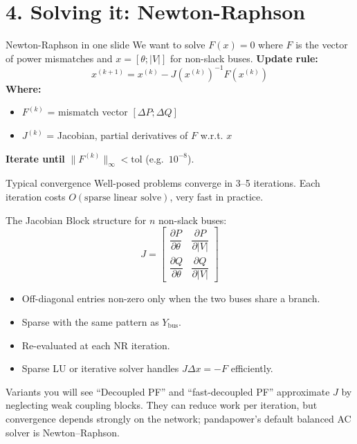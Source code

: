 \documentclass[aspectratio=169,10pt]{beamer}
\begin{document}
\section*{4. Solving it: Newton-Raphson}

\begin{frame}{Newton-Raphson in one slide}
We want to solve $F(x) = 0$ where $F$ is the vector of power mismatches and $x = [\theta; |V|]$ for non-slack buses.
\vspace{0.4em}
\textbf{Update rule:}
\begin{equation*}
x^{(k+1)} = x^{(k)} - J(x^{(k)})^{-1} F(x^{(k)})
\end{equation*}
\textbf{Where:}
\begin{itemize}
  \item $F^{(k)}$ = mismatch vector $[\Delta P; \Delta Q]$
  \item $J^{(k)}$ = Jacobian, partial derivatives of $F$ w.r.t. $x$
\end{itemize}
\textbf{Iterate until} $\| F^{(k)} \|_\infty < \text{tol}$ (e.g.\ $10^{-8}$).
\vspace{0.4em}
\begin{block}{Typical convergence}
Well-posed problems converge in 3--5 iterations. Each iteration costs $O(\text{sparse linear solve})$, very fast in practice.
\end{block}
\end{frame}

\begin{frame}{The Jacobian}
Block structure for $n$ non-slack buses:
\begin{equation*}
J = \begin{bmatrix}
\dfrac{\partial P}{\partial \theta} & \dfrac{\partial P}{\partial |V|} \\[6pt]
\dfrac{\partial Q}{\partial \theta} & \dfrac{\partial Q}{\partial |V|}
\end{bmatrix}
\end{equation*}
\begin{itemize}
  \item Off-diagonal entries non-zero only when the two buses share a branch.
  \item Sparse with the same pattern as $Y_{\text{bus}}$.
  \item Re-evaluated at each NR iteration.
  \item Sparse LU or iterative solver handles $J \Delta x = -F$ efficiently.
\end{itemize}
\begin{alertblock}{Variants you will see}
``Decoupled PF'' and ``fast-decoupled PF'' approximate $J$ by neglecting weak coupling blocks. They can reduce work per iteration, but convergence depends strongly on the network; pandapower's default balanced AC solver is Newton--Raphson.
\end{alertblock}
\end{frame}
\end{document}
